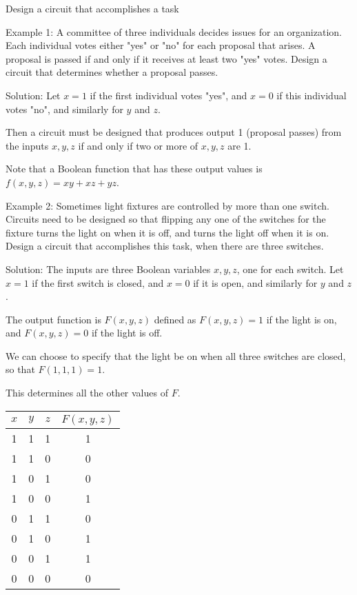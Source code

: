 \documentclass{article}
\begin{document}
Design a circuit that accomplishes a task

Example 1: A committee of three individuals decides issues for an organization. Each individual votes either "yes" or "no" for each proposal that arises. A proposal is passed if and only if it receives at least two "yes" votes. Design a circuit that determines whether a proposal passes. 

Solution: Let $x = 1$ if the first individual votes "yes", and $x = 0$ if this individual votes "no", and similarly for $y$ and $z$. 

Then a circuit must be designed that produces output 1 (proposal passes) from the inputs $x,y,z$ if and only if two or more of $x,y,z$ are 1. 

Note that a Boolean function that has these output values is $f(x,y,z) = xy + xz + yz$.

Example 2: Sometimes light fixtures are controlled by more than one switch. Circuits need to be designed so that flipping any one of the switches for the fixture turns the light on when it is off, and turns the light off when it is on. Design a circuit that accomplishes this task, when there are three switches.

Solution: The inputs are three Boolean variables $x,y,z$, one for each switch. Let $x = 1$ if the first switch is closed, and $x = 0$ if it is open, and similarly for $y$ and $z$. 

The output function is $F(x,y,z)$ defined as $F(x,y,z) = 1$ if the light is on, and $F(x,y,z)= 0$ if the light is off. 

We can choose to specify that the light be on when all three switches are closed, so that $F(1,1,1) = 1$.

This determines all the other values of $F$. 


\begin{table}
    \centering
    \begin{tabular}{|c|c|c|c|}\hline
         $x$& $y$ & $z$ & $F(x,y,z)$\\\hline
         1&  1&  1& 1\\
         1&  1&  0& 0\\
         1&  0&  1& 0\\
         1&  0&  0& 1\\
         0&  1&  1& 0\\
         0&  1&  0& 1\\
         0&  0&  1& 1\\
         0&  0&  0& 0\\\hline
    \end{tabular}
\end{table}
\end{document}
